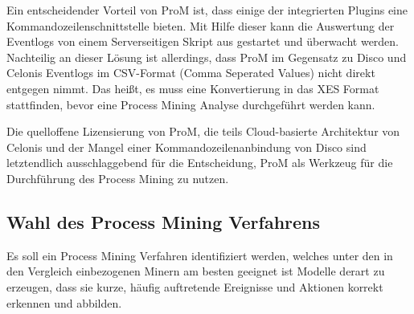 \begin{table}[!h]
\centering
{}
\caption{Gegenüberstellung von technischen Eigenschaften der populärsten Process Mining Lösungen(Quelle: Erling C., Vergleich und Evaluation von Process Mining Software, 2019, S. 36,37,44,83 \ref{comparison2})}
\label{comparison2}
\end{table}

Ein entscheidender Vorteil von ProM ist, dass einige der integrierten Plugins eine Kommandozeilenschnittstelle bieten. Mit Hilfe dieser kann die Auswertung der Eventlogs von einem Serverseitigen Skript aus gestartet und überwacht werden. Nachteilig an dieser Lösung ist allerdings, dass ProM im Gegensatz zu Disco und Celonis Eventlogs im CSV-Format (Comma Seperated Values) nicht direkt entgegen nimmt. Das heißt, es muss eine Konvertierung in das XES Format stattfinden, bevor eine Process Mining Analyse durchgeführt werden kann.

Die quelloffene Lizensierung von ProM, die teils Cloud-basierte Architektur von Celonis und der Mangel einer Kommandozeilenanbindung von Disco sind letztendlich ausschlaggebend für die Entscheidung, ProM als Werkzeug für die Durchführung des Process Mining zu nutzen. 

\subsection{Wahl des Process Mining Verfahrens}
Es soll ein Process Mining Verfahren identifiziert werden, welches unter den in den Vergleich einbezogenen Minern am besten geeignet ist Modelle derart zu erzeugen, dass sie kurze, häufig auftretende Ereignisse und Aktionen korrekt erkennen und abbilden. 


